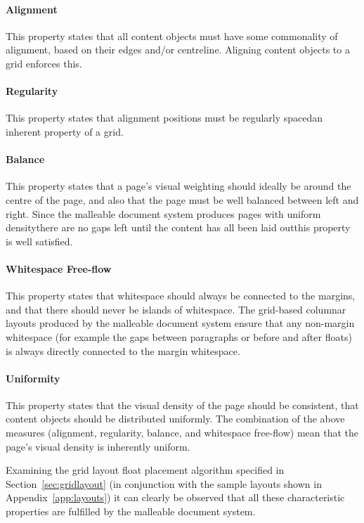 \paragraph{Alignment} This property states that all content objects must have some commonality of alignment, based on their edges and/or centreline. Aligning content objects to a grid enforces this.

\paragraph{Regularity} This property states that alignment positions must be regularly spaced\ed an inherent property of a grid.

\paragraph{Balance} This property states that a page's visual weighting should ideally be around the centre of the page, and also that the page must be well balanced between left and right. Since the malleable document system produces pages with uniform density\ed there are no gaps left until the content has all been laid out\ed this property is well satisfied.

\paragraph{Whitespace Free-flow} This property states that whitespace should always be connected to the margins, and that there should never be islands of whitespace. The grid-based columnar layouts produced by the malleable document system ensure that any non-margin whitespace (for example the gaps between paragraphs or before and after floats) is always directly connected to the margin whitespace.

\paragraph{Uniformity} This property states that the visual density of the page should be consistent, \ie{} that content objects should be distributed uniformly. The combination of the above measures (alignment, regularity, balance, and whitespace free-flow) mean that the page's visual density is inherently uniform.

\vspace{2em}
Examining the grid layout float placement algorithm specified in Section~\ref{sec:gridlayout} (in conjunction with the sample layouts shown in Appendix~\ref{app:layouts}) it can clearly be observed that all these characteristic properties are fulfilled by the malleable document system.

